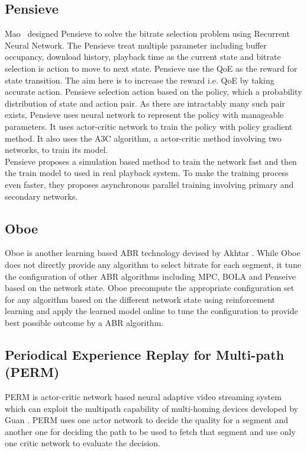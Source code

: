 \subsection{Pensieve}
Mao \etal\ designed Pensieve\cite{10.1145/3098822.3098843} to solve the bitrate selection problem using Recurrent Neural Network. The Pensieve treat multiple parameter including buffer occupancy, download history, playback time as the current state and bitrate selection is action to move to next state. Pensieve use the QoE as the reward for state transition. The aim here is to increase the reward i.e. QoE by taking accurate action. Pensieve selection action based on the policy, which a probability distribution of state and action pair. As there are intractably many such pair exists, Pensieve uses neural network to represent the policy with manageable parameters. It uses actor-critic network to train the policy with policy gradient method\cite{sutton1999policy}. It also uses the A3C\cite{10.5555/3045390.3045594} algorithm, a actor-critic method involving two networks, to train its model.\\
Pensieve proposes a simulation based method to train the network fast and then the train model to used in real playback system. To make the training process even faster, they proposes asynchronous parallel training involving primary and secondary networks.

\subsection{Oboe}
Oboe\cite{10.1145/3230543.3230558} is another learning based ABR technology devised by Akhtar \etal. While Oboe does not directly provide any algorithm to select bitrate for each segment, it tune the configuration of other ABR algorithms including MPC\cite{10.1145/2785956.2787486,10.1145/2670518.2673877}, BOLA\cite{7524428} and Penseive\cite{10.1145/3098822.3098843} based on the network state. Oboe precompute the appropriate configuration set for any algorithm based on the different network state using reinforcement learning and apply the learned model online to tune the configuration to provide best possible outcome by a ABR algorithm.


\subsection{Periodical Experience Replay for Multi-path (PERM)}
PERM\cite{9155492} is actor-critic network based neural adaptive video streaming system which can exploit the multipath capability of multi-homing devices developed by Guan \etal. PERM uses one actor network to decide the quality for a segment and another one for deciding the path to be used to fetch that segment and use only one critic network to evaluate the decision.

